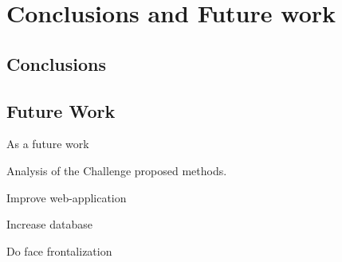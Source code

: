 \chapter{Conclusions and Future work} \label{chap:conclusions}

\section{Conclusions}


\section{Future Work}


As a future work 

Analysis of the Challenge proposed methods.

Improve web-application

Increase database

Do face frontalization